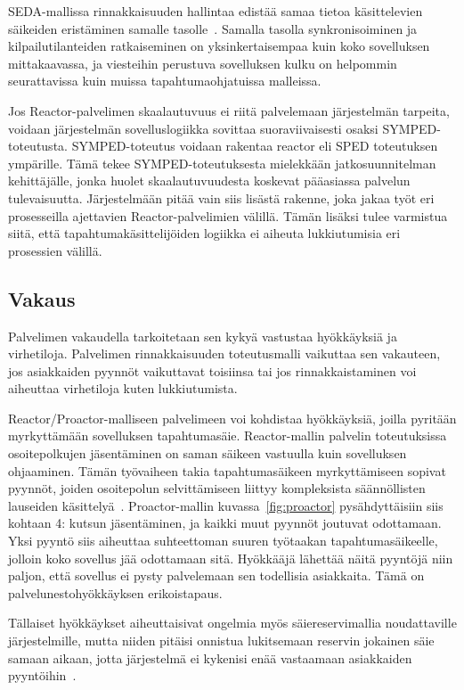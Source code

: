 \documentclass[finnish]{tktltiki2}
\theoremstyle{definition}
\theoremstyle{remark}
\begin{document}
SEDA-mallissa rinnakkaisuuden hallintaa edistää
samaa tietoa käsittelevien säikeiden eristäminen samalle tasolle~\cite{welsh_seda_2001}.
Samalla tasolla synkronisoiminen ja kilpailutilanteiden ratkaiseminen on
yksinkertaisempaa kuin koko sovelluksen mittakaavassa, ja
viesteihin perustuva sovelluksen kulku on helpommin seurattavissa kuin
muissa tapahtumaohjatuissa malleissa.

Jos Reactor-palvelimen skaalautuvuus ei riitä palvelemaan
järjestelmän tarpeita, voidaan järjestelmän sovelluslogiikka
sovittaa suoraviivaisesti osaksi SYMPED-toteutusta. SYMPED-toteutus
voidaan rakentaa reactor eli SPED toteutuksen ympärille. Tämä
tekee SYMPED-toteutuksesta mielekkään jatkosuunnitelman kehittäjälle,
jonka huolet skaalautuvuudesta koskevat pääasiassa palvelun tulevaisuutta.
Järjestelmään pitää vain siis lisästä rakenne, joka
jakaa työt eri prosesseilla ajettavien Reactor-palvelimien välillä.
Tämän lisäksi tulee varmistua siitä, että tapahtumakäsittelijöiden
logiikka ei aiheuta lukkiutumisia eri prosessien välillä.

\subsection{Vakaus}
Palvelimen vakaudella tarkoitetaan sen kykyä vastustaa hyökkäyksiä ja
virhetiloja.
Palvelimen rinnakkaisuuden toteutusmalli vaikuttaa sen vakauteen, jos asiakkaiden
pyynnöt vaikuttavat toisiinsa tai jos rinnakkaistaminen voi aiheuttaa virhetiloja kuten
lukkiutumista.

Reactor/Proactor-malliseen palvelimeen voi kohdistaa hyökkäyksiä, joilla pyritään
myrkyttämään sovelluksen tapahtumasäie. Reactor-mallin palvelin toteutuksissa
osoitepolkujen jäsentäminen on saman säikeen vastuulla kuin sovelluksen ohjaaminen.
Tämän työvaiheen takia
tapahtumasäikeen myrkyttämiseen sopivat pyynnöt,
joiden osoitepolun selvittämiseen liittyy kompleksista
säännöllisten lauseiden käsittelyä~\cite{davis_case_2017}.
Proactor-mallin kuvassa~\ref{fig:proactor} pysähdyttäisiin siis kohtaan 4: kutsun jäsentäminen, ja
kaikki muut pyynnöt joutuvat odottamaan.
Yksi pyyntö siis aiheuttaa suhteettoman suuren työtaakan
tapahtumasäikeelle, jolloin koko sovellus jää odottamaan sitä.
Hyökkääjä lähettää näitä pyyntöjä niin paljon, että sovellus
ei pysty palvelemaan sen todellisia asiakkaita. Tämä
on palvelunestohyökkäyksen erikoistapaus.

Tällaiset hyökkäykset aiheuttaisivat ongelmia myös säiereservimallia
noudattaville järjestelmille, mutta niiden pitäisi onnistua
lukitsemaan reservin jokainen säie samaan aikaan, jotta
järjestelmä ei kykenisi enää vastaamaan asiakkaiden pyyntöihin~\cite{davis_case_2017}.
\end{document}
